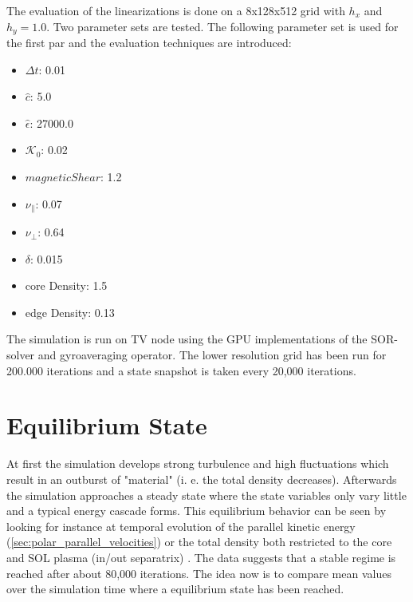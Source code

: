 \documentclass[master.tex]{subfiles}
\begin{document}
The evaluation of the linearizations is done on a 8x128x512 grid with $h_x$ and $h_y=1.0$. Two parameter sets are tested. The following parameter set is used for the first par and the evaluation techniques are introduced:
\begin{itemize}
    \item $\Delta t$: 0.01
    \item $\hat{c}$: 5.0
    \item $\hat{\epsilon}$: 27000.0
    \item $\mathcal{K}_0$: 0.02
    \item $magnetic Shear$: 1.2
    \item $\nu_{\parallel}$: 0.07
    \item $\nu_{\perp}$: 0.64
    \item $\delta$: 0.015
    \item core Density: 1.5
    \item edge Density: 0.13
\end{itemize}
The simulation is run on \ac{TV} node using the GPU implementations of the \ac{SOR}-solver and gyroaveraging operator. The lower resolution grid has been run for 200.000 iterations and a state snapshot is taken every 20,000 iterations.

\section{Equilibrium State}
At first the simulation develops strong turbulence and high fluctuations which result in an outburst of "material" (i. e. the total density decreases). Afterwards the simulation approaches a steady state where the state variables only vary little and a typical energy cascade forms. This equilibrium behavior can be seen by looking for instance at temporal evolution of the parallel kinetic energy (\autoref{sec:polar_parallel_velocities}) or the total density both restricted to the core and \ac{SOL} plasma (in/out separatrix) . The data suggests that a stable regime is reached after about 80,000 iterations. The idea now is to compare mean values over the simulation time where a equilibrium state has been reached. 
\end{document}
